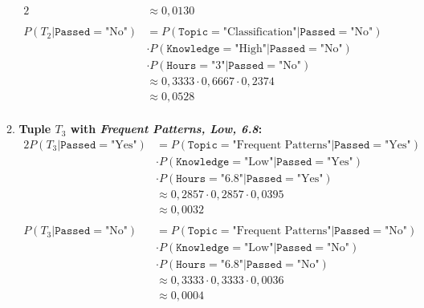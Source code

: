 \documentclass[
english,
smallborders
]{i6prcsht}
\newcommand{\Likelihood}[4]{P(\texttt{#1}=\text{"#2"} | \texttt{#3}=\text{"#4"})}
\newcommand{\LikelihoodTuple}[3]{P(#1 | \texttt{#2}=\text{"#3"})}
\begin{document}
\begin{solution}
\begin{enumerate}
\begin{enumerate}
\begin{alignat*}{2}
				                                               & \approx 0,0130                                     \\
				                                               &                                                    \\
				            \LikelihoodTuple{T_2}{Passed}{No}  & =  \Likelihood{Topic}{Classification}{Passed}{No}  \\
				                                               & \cdot \Likelihood{Knowledge}{High}{Passed}{No}     \\
				                                               & \cdot \Likelihood{Hours}{3}{Passed}{No}            \\
				                                               & \approx  0,3333 \cdot 0,6667 \cdot 0,2374          \\
				                                               & \approx 0,0528                                     \\
			            \end{alignat*}
			            
			      \item \textbf{Tuple $T_3$ with \textit{Frequent Patterns, Low, 6.8}:}
			            \begin{alignat*}{2}
				            \LikelihoodTuple{T_3}{Passed}{Yes} & =  \Likelihood{Topic}{Frequent Patterns}{Passed}{Yes} \\
				                                               & \cdot \Likelihood{Knowledge}{Low}{Passed}{Yes}        \\
				                                               & \cdot \Likelihood{Hours}{6.8}{Passed}{Yes}            \\
				                                               & \approx  0,2857 \cdot 0,2857 \cdot 0,0395             \\
				                                               & \approx 0,0032                                        \\
				                                               &                                                       \\
				            \LikelihoodTuple{T_3}{Passed}{No}  & =  \Likelihood{Topic}{Frequent Patterns}{Passed}{No}  \\
				                                               & \cdot \Likelihood{Knowledge}{Low}{Passed}{No}         \\
				                                               & \cdot \Likelihood{Hours}{6.8}{Passed}{No}             \\
				                                               & \approx  0,3333 \cdot 0,3333 \cdot 0,0036             \\
				                                               & \approx 0,0004                                        \\
			            \end{alignat*}
		      \end{enumerate}
		      

\end{enumerate}
\end{solution}
\end{document}
